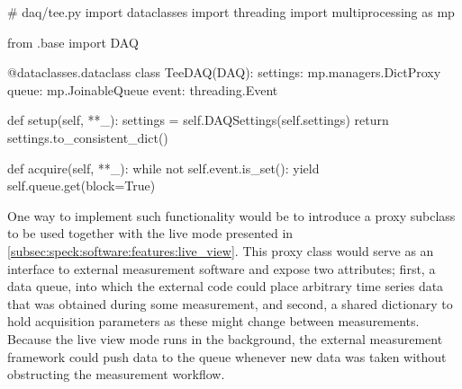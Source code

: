 \begin{marginlisting}
    \begin{pycode}[
        fontsize=\footnotesize,%
        breaklines,%
        breakafter=.,%
    ]
        # daq/tee.py
        import dataclasses
        import threading
        import multiprocessing as mp

        from .base import DAQ

        @dataclasses.dataclass
        class TeeDAQ(DAQ):
            settings: mp.managers.DictProxy
            queue: mp.JoinableQueue
            event: threading.Event

            def setup(self, **_):
                settings = self.DAQSettings(self.settings)
                return settings.to_consistent_dict()

            def acquire(self, **_):
                while not self.event.is_set():
                    yield self.queue.get(block=True)
    \end{pycode}
    \caption{
        Template design for a proxy  implementation to stream noise spectra from an external measurement framework.
        The  attribute is a dictionary proxy shared between processes and used to pass acquisition parameters from the measurement framework to \pyspeck.
    }
    \label{lst:speck:conclusion:tee}
\end{marginlisting}

One way to implement such functionality would be to introduce a proxy  subclass to be used together with the live mode presented in \cref{subsec:speck:software:features:live_view}.
This proxy class would serve as an interface to external measurement software and expose two attributes; first, a data queue, into which the external code could place arbitrary time series data that was obtained during some measurement, and second, a shared dictionary to hold acquisition parameters as these might change between measurements.
Because the live view mode runs in the background, the external measurement framework could push data to the queue whenever new data was taken without obstructing the measurement workflow.

